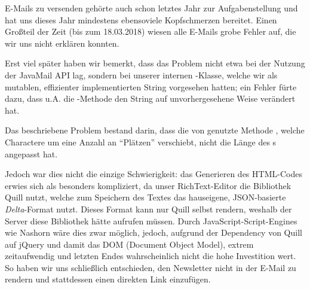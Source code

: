 E-Mails zu versenden gehörte auch schon letztes Jahr zur Aufgabenstellung
und hat uns dieses Jahr mindestens ebensoviele Kopfschmerzen bereitet.
Einen Großteil der Zeit (bis zum 18.03.2018)
wiesen alle E-Mails grobe Fehler auf,
die wir uns nicht erklären konnten.

Erst viel später haben wir bemerkt,
dass das Problem nicht etwa bei der Nutzung der JavaMail API lag,
sondern bei unserer internen -Klasse,
welche wir als mutablen,
effizienter implementierten String vorgesehen hatten;
ein Fehler fürte dazu,
dass u.A. die -Methode den String auf unvorhergesehene Weise verändert hat.

Das beschriebene Problem bestand darin,
dass die von  genutzte Methode ,
welche Charactere um eine Anzahl an ``Plätzen'' verschiebt,
nicht die Länge des s angepasst hat.

Jedoch war dies nicht die einzige Schwierigkeit:
das Generieren des HTML-Codes erwies sich als besonders kompliziert,
da unser RichText-Editor die Bibliothek Quill nutzt,
welche zum Speichern des Textes das hauseigene, JSON-basierte \emph{Delta}-Format nutzt.
Dieses Format kann nur Quill selbst rendern,
weshalb der Server diese Bibliothek hätte aufrufen müssen.
Durch JavaScript-Script-Engines wie Nashorn wäre dies zwar möglich,
jedoch,
aufgrund der Dependency von Quill auf jQuery und damit das DOM (Document Object Model),
extrem zeitaufwendig und letzten Endes wahrscheinlich nicht die hohe Investition wert.
So haben wir uns schließlich entschieden,
den Newsletter nicht in der E-Mail zu rendern und stattdessen einen direkten Link einzufügen.
